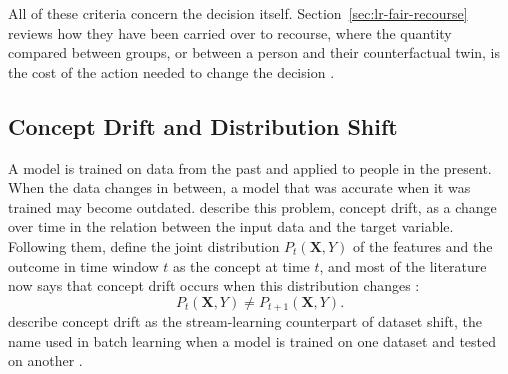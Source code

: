 All of these criteria concern the decision itself. Section~\ref{sec:lr-fair-recourse} reviews how
they have been carried over to recourse, where the quantity compared between groups, or between a
person and their counterfactual twin, is the cost of the action needed to change the decision
\cite{vonkugelgen2022fairness}.

\subsection{Concept Drift and Distribution Shift}
\label{sec:bg-drift}

A model is trained on data from the past and applied to people in the present. When the data changes
in between, a model that was accurate when it was trained may become outdated.
\citet{gama2014survey} describe this problem, concept drift, as a change over time in the relation
between the input data and the target variable. Following them, \citet{webb2016characterizing} define
the joint distribution $P_t(\mathbf{X}, Y)$ of the features and the outcome in time window $t$ as the
concept at time $t$, and most of the literature now says that concept drift occurs when this
distribution changes \cite{lu2018learning}:
\begin{equation}
  P_t(\mathbf{X}, Y) \neq P_{t+1}(\mathbf{X}, Y).
  \label{eq:bg-drift}
\end{equation}
\citet{webb2016characterizing} describe concept drift as the stream-learning counterpart of dataset
shift, the name used in batch learning when a model is trained on one dataset and tested on another
\cite{moreno2012unifying}.

